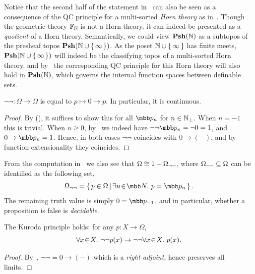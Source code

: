 \begin{remark}
  Notice that the second half of the statement in~ can also be seen as a consequence of the \gls{QC} principle for a multi-sorted \emph{Horn theory} as in~. Though the geometric theory $\mathbb{F}_{\mathbb{N}}$ is not a Horn theory, it can indeed be presented as a \emph{quotient} of a Horn theory. Semantically, we could view $\mathbf{Psh}(\mathbb{N})$ as a subtopos of the presheaf topos $\mathbf{Psh}(\mathbb{N} \cup \{\,\infty\,\})$. As the poset $\mathbb{N} \cup \{\,\infty\,\}$ has finite meets, $\mathbf{Psh}(\mathbb{N} \cup \{\,\infty\,\})$ will indeed be the classifying topos of a multi-sorted Horn theory, and by~ the corresponding \gls{QC} principle for this Horn theory will also hold in $\mathbf{Psh}(\mathbb{N})$, which governs the internal function spaces between definable sets.
\end{remark}

\begin{lemma}\label{lem:doublenegcontinuous}
  $\neg\neg \colon \Omega \to \Omega$ is equal to $p \mapsto 0 \to p$. In particular, it is continuous.
\end{lemma}
\begin{proof}
  By (\AxiomGR), it suffices to show this for all $\mbb p_n$ for $n\in\mathbb{N}_\bot$. When $n = -1$ this is trivial. When $n \ge 0$, by~ we indeed have $\neg\neg\mbb p_n = \neg 0 = 1$, and $0 \to \mbb p_n = 1$. Hence, in both cases $\neg\neg$ coincides with $0 \to (-)$, and by function extensionality they coincides. 
\end{proof}

\begin{remark}\label{rem:empdecidable}
  From the computation in~ we also see that $\Omega \cong 1 + \Omega_{\neg\neg}$, where $\Omega_{\neg\neg} \subseteq \Omega$ can be identified as the following set,
  \[ \Omega_{\dneg} = \scomp{p\in\Omega}{\ex n\N p = \mbb p_n}. \]
  The remaining truth value is simply $0 = \mbb p_{-1}$, and in particular, whether a proposition is false is \emph{decidable}.
\end{remark}

\begin{corollary}\label{Kuroda}
  The Kuroda principle holds: for any $p \colon X \to \Omega$, 
  \[ \forall x\!\in\!X.\  \neg\neg p(x) \to \neg\neg \forall x\!\in\!X.\  p(x). \]
\end{corollary}
\begin{proof}
  By~, $\neg\neg = 0 \to (-)$ which is a \emph{right adjoint}, hence preserves all limits.
\end{proof}

